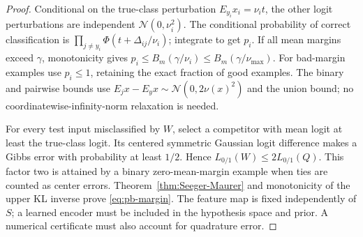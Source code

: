 \begin{proof}
Conditional on the true-class perturbation $E_{y_i}x_i=\nu_it$, the other
logit perturbations are independent $\mathcal N(0,\nu_i^2)$. The conditional
probability of correct classification is
$\prod_{j\ne y_i}\Phi(t+\Delta_{ij}/\nu_i)$; integrate to get $p_i$.
If all mean margins exceed $\gamma$, monotonicity gives
$p_i\le B_m(\gamma/\nu_i)\le B_m(\gamma/\nu_{\max})$.
For bad-margin examples use $p_i\le1$, retaining the exact fraction of good
examples. The binary and pairwise bounds use
$E_jx-E_yx\sim\mathcal N(0,2\nu(x)^2)$ and the union bound; no
coordinatewise-infinity-norm relaxation is needed.

For every test input misclassified by $W$, select a competitor with mean
logit at least the true-class logit. Its centered symmetric Gaussian logit
difference makes a Gibbs error with probability at least $1/2$. Hence
$L_{0/1}(W)\le2L_{0/1}(Q)$. This factor two is attained by a binary
zero-mean-margin example when ties are counted as center errors.
Theorem~\ref{thm:Seeger-Maurer} and monotonicity of the upper KL inverse
prove \eqref{eq:pb-margin}. The feature map is fixed independently of $S$;
a learned encoder must be included in the hypothesis space and prior.
A numerical certificate must also account for quadrature error.
\end{proof}
